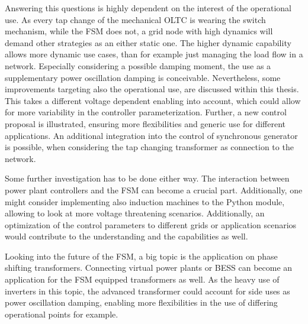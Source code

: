 Answering this questions is highly dependent on the interest of the operational use.
As every tap change of the mechanical \acs{OLTC} is wearing the switch mechanism, while the \acs{FSM} does not, a grid node with high dynamics will demand other strategies as an either static one.
The higher dynamic capability allows more dynamic use cases, than for example just managing the load flow in a network.
Especially considering a possible damping moment, the use as a supplementary power oscillation damping is conceivable.
Nevertheless, some improvements targeting also the operational use, are discussed within this thesis.
This takes a different voltage dependent enabling into account, which could allow for more variability in the controller parameterization.
Further, a new control proposal is illustrated, ensuring more flexibilities and generic use for different applications.
An additional integration into the control of synchronous generator is possible, when considering the tap changing transformer as connection to the network.

Some further investigation has to be done either way. 
The interaction between power plant controllers and the \acs{FSM} can become a crucial part. 
Additionally, one might consider implementing also induction machines to the Python module, allowing to look at more voltage threatening scenarios.
Additionally, an optimization of the control parameters to different grids or application scenarios would contribute to the understanding and the capabilities as well. 

Looking into the future of the \acs{FSM}, a big topic is the application on phase shifting transformers.
Connecting virtual power plants or \acf{BESS} can become an application for the \acs{FSM} equipped transformers as well.
As the heavy use of inverters in this topic, the advanced transformer could account for side uses as power oscillation damping, enabling more flexibilities in the use of differing operational points for example.